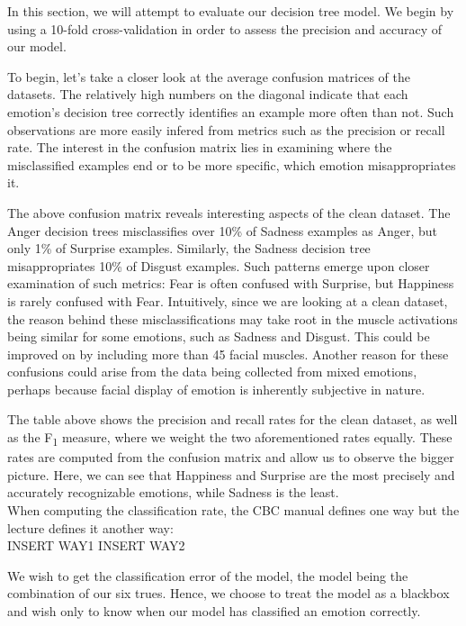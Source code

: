 In this section, we will attempt to evaluate our decision tree model. We begin by using a 10-fold cross-validation
in order to assess the precision and accuracy of our model. 

To begin, let's take a closer look at the average confusion matrices of the datasets.
The relatively high numbers on the diagonal indicate that each emotion's decision tree correctly
identifies an example more often than not. Such observations are more easily infered from metrics such as the precision or recall rate.
The interest in the confusion matrix lies in examining where the misclassified examples end or to be more specific,
which emotion misappropriates it. 



The above confusion matrix reveals interesting aspects of the clean dataset.
The Anger decision trees misclassifies over 10\% of Sadness examples as Anger, but only 1\% of Surprise examples.
Similarly, the Sadness decision tree misappropriates 10\% of Disgust examples.
Such patterns emerge upon closer examination of such metrics: Fear is often confused with Surprise, but Happiness is rarely confused with Fear.
Intuitively, since we are looking at a clean dataset,
the reason behind these misclassifications may take root in the muscle activations being similar for some emotions, such as Sadness and Disgust.
This could be improved on by including  more than 45 facial muscles.
Another reason for these confusions could arise from the data being collected from mixed emotions, perhaps because facial display
of emotion is inherently subjective in nature.



The table above shows the precision and recall rates for the clean dataset, as well as the F\textsubscript{1} measure,
where we weight the two aforementioned rates equally. These rates are computed from the confusion matrix and allow us to
observe the bigger picture. Here, we can see that Happiness and Surprise are the most precisely and accurately recognizable
emotions, while Sadness is the least. \\

When computing the classification rate, the CBC manual defines one way but the lecture defines it another way:\\
INSERT WAY1
INSERT WAY2

We wish to get the classification error of the model, the model being the combination of our six trues.
Hence, we choose to treat the model as a blackbox and wish only to know when our model has classified an emotion correctly.

